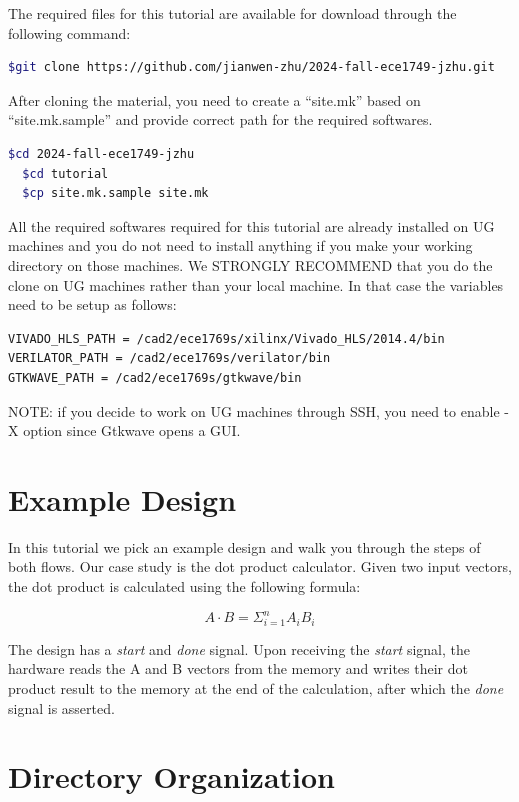 \documentclass[12pt]{article}
\begin{document}
The required files for this tutorial are available for download
through the following command:

\begin{lstlisting}[language=bash]
  $git clone https://github.com/jianwen-zhu/2024-fall-ece1749-jzhu.git
\end{lstlisting}

After cloning the material, you need to create a “site.mk” based on
“site.mk.sample” and provide correct path for the required softwares.

\begin{lstlisting}[language=bash]
  $cd 2024-fall-ece1749-jzhu
  $cd tutorial
  $cp site.mk.sample site.mk
\end{lstlisting}


All the required softwares required for this tutorial are already
installed on UG machines and you do not need to install anything if
you make your working directory on those machines. We STRONGLY
RECOMMEND that you do the clone on UG machines rather than your local
machine. In that case the variables need to be setup as follows:

\begin{lstlisting}[language=bash]
VIVADO_HLS_PATH = /cad2/ece1769s/xilinx/Vivado_HLS/2014.4/bin
VERILATOR_PATH = /cad2/ece1769s/verilator/bin
GTKWAVE_PATH = /cad2/ece1769s/gtkwave/bin
\end{lstlisting}

NOTE: if you decide to work on UG machines through SSH, you need to
enable -X option since Gtkwave opens a GUI.

\section{Example Design}

In this tutorial we pick an example design and walk you through the
steps of both flows. Our case study is the dot product
calculator. Given two input vectors, the dot product is calculated
using the following formula:

\[
A \cdot B = \Sigma_{i=1}^{n} A_i B_i
\]

The design has a {\em start} and {\em done} signal. Upon receiving the
{\em start} signal, the hardware reads the A and B vectors from the
memory and writes their dot product result to the memory at the end of
the calculation, after which the {\em done} signal is asserted.

\section{Directory Organization}
\end{document}
